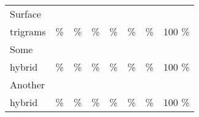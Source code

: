 \documentclass[11pt,a4paper]{article}
\begin{document}
\begin{table*}[h]
\begin{center}
\begin{scriptsize}
\begin{tabular}{l|llll|l|l|l}
        \hline
        Surface  
&       &      &      &      &       &       &     \\
        trigrams 
&    \% &   \% &   \% &   \% &    \% &    \% & 100 \% \\
        \hline
        Some    
&       &      &      &      &       &       &     \\
        hybrid  
&    \% &   \% &   \% &   \% &    \% &    \% & 100 \% \\
        \hline
        Another  
&       &      &      &      &       &       &     \\
        hybrid   
&    \% &   \% &   \% &   \% &    \% &    \% & 100 \% \\
        \hline
      \end{tabular}
    \end{scriptsize}
  \end{center}
\end{table*}
\end{document}
